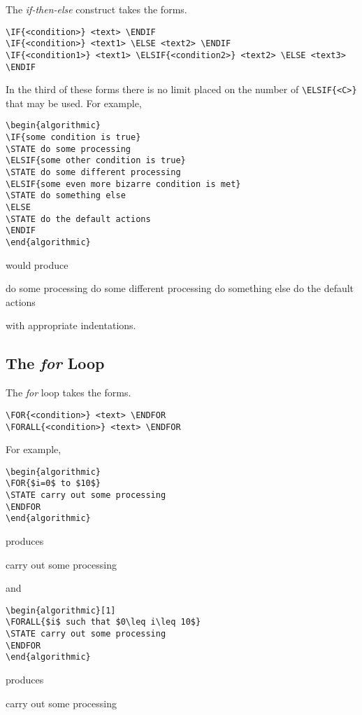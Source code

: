 \documentclass[letterpaper]{article}
\begin{document}
The \emph{if-then-else} construct takes the forms.
\begin{verbatim}
\IF{<condition>} <text> \ENDIF
\IF{<condition>} <text1> \ELSE <text2> \ENDIF
\IF{<condition1>} <text1> \ELSIF{<condition2>} <text2> \ELSE <text3> \ENDIF
\end{verbatim}
In the third of these forms there is no limit placed on the number of
\verb+\ELSIF{<C>}+ that may be used.  For example,
\begin{verbatim}
\begin{algorithmic}
\IF{some condition is true}
\STATE do some processing
\ELSIF{some other condition is true}
\STATE do some different processing
\ELSIF{some even more bizarre condition is met}
\STATE do something else
\ELSE
\STATE do the default actions
\ENDIF
\end{algorithmic}
\end{verbatim}
would produce
\begin{algorithmic}
    \STATE do some processing
    \STATE do some different processing
    \STATE do something else
  \ELSE
    \STATE do the default actions
  \ENDIF
\end{algorithmic}
with appropriate indentations.

\subsection{The \emph{for} Loop}

The \emph{for} loop takes the forms.
\begin{verbatim}
\FOR{<condition>} <text> \ENDFOR
\FORALL{<condition>} <text> \ENDFOR
\end{verbatim}
For example,
\begin{verbatim}
\begin{algorithmic}
\FOR{$i=0$ to $10$}
\STATE carry out some processing 
\ENDFOR
\end{algorithmic}
\end{verbatim}
produces
\begin{algorithmic}
    \STATE carry out some processing 
  \ENDFOR
\end{algorithmic}
and
\begin{verbatim}
\begin{algorithmic}[1]
\FORALL{$i$ such that $0\leq i\leq 10$}
\STATE carry out some processing 
\ENDFOR
\end{algorithmic}
\end{verbatim}
produces
\begin{algorithmic}[1]
    \STATE carry out some processing 
  \ENDFOR
\end{algorithmic}
\end{document}
